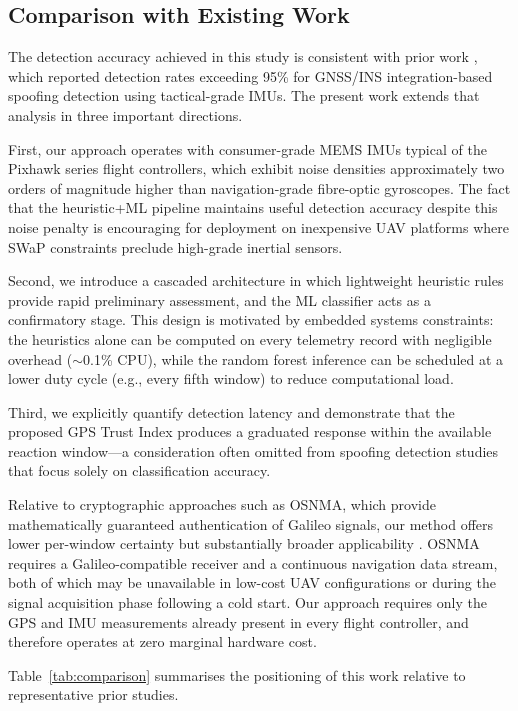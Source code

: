 \documentclass[electronics,article,accept,moreauthors]{Definitions/mdpi}
\begin{document}
\subsection{Comparison with Existing Work}

The detection accuracy achieved in this study is consistent with prior work \citep{tanil2018}, which reported detection rates exceeding 95\% for GNSS/INS integration-based spoofing detection using tactical-grade IMUs. The present work extends that analysis in three important directions.

First, our approach operates with consumer-grade MEMS IMUs typical of the Pixhawk series flight controllers, which exhibit noise densities approximately two orders of magnitude higher than navigation-grade fibre-optic gyroscopes. The fact that the heuristic+ML pipeline maintains useful detection accuracy despite this noise penalty is encouraging for deployment on inexpensive UAV platforms where SWaP constraints preclude high-grade inertial sensors.

Second, we introduce a cascaded architecture in which lightweight heuristic rules provide rapid preliminary assessment, and the ML classifier acts as a confirmatory stage. This design is motivated by embedded systems constraints: the heuristics alone can be computed on every telemetry record with negligible overhead ($\sim$0.1\% CPU), while the random forest inference can be scheduled at a lower duty cycle (e.g., every fifth window) to reduce computational load.

Third, we explicitly quantify detection latency and demonstrate that the proposed GPS Trust Index produces a graduated response within the available reaction window---a consideration often omitted from spoofing detection studies that focus solely on classification accuracy.

Relative to cryptographic approaches such as OSNMA, which provide mathematically guaranteed authentication of Galileo signals, our method offers lower per-window certainty but substantially broader applicability \citep{psiaki2016}. OSNMA requires a Galileo-compatible receiver and a continuous navigation data stream, both of which may be unavailable in low-cost UAV configurations or during the signal acquisition phase following a cold start. Our approach requires only the GPS and IMU measurements already present in every flight controller, and therefore operates at zero marginal hardware cost.

Table~\ref{tab:comparison} summarises the positioning of this work relative to representative prior studies.
\end{document}
